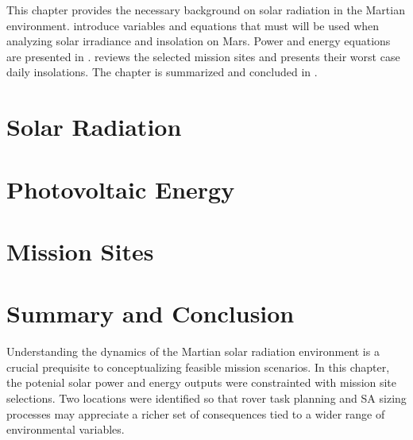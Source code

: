 This chapter provides the necessary background on solar radiation in the Martian environment.  introduce variables and equations that must will be used when analyzing solar irradiance and insolation on Mars. Power and energy equations are presented in .  reviews the selected mission sites and presents their worst case daily insolations. The chapter is summarized and concluded in .

\section{Solar Radiation}
\label{sec:MarsSolarEnergy:SolarRadiation}


\clearpage
\section{Photovoltaic Energy}
\label{sec:MarsSolarEnergy:PhotovoltaicEnergy}


\clearpage
\section{Mission Sites}
\label{sec:MarsSolarEnergy:MissionSites}


\section{Summary and Conclusion}
\label{sec:MarsSolarEnergy:SummaryAndConclusion}
Understanding the dynamics of the Martian solar radiation environment is a crucial prequisite to  conceptualizing feasible mission scenarios. In this chapter, the potenial solar power and energy outputs were constrainted with mission site selections. Two locations were identified so that rover task planning and \ac{SA} sizing processes may appreciate a richer set of consequences tied to a wider range of environmental variables.
